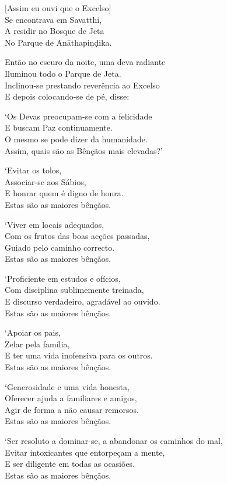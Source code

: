 [Assim eu ouvi que o Excelso]\\
Se encontrava em Savatthi,\\
A residir no Bosque de Jeta\\
No Parque de Anāthapiṇḍika.

Então no escuro da noite, uma deva radiante\\
Iluminou todo o Parque de Jeta.\\
Inclinou-se prestando reverência ao Excelso\\
E depois colocando-se de pé, disse:

`Os Devas preocupam-se com a felicidade\\
E buscam Paz continuamente.\\
O mesmo se pode dizer da humanidade.\\
Assim, quais são as Bênçãos mais elevadas?'

`Evitar os tolos,\\
Associar-se aos Sábios,\\
E honrar quem é digno de honra.\\
Estas são as maiores bênçãos.

`Viver em locais adequados,\\
Com os frutos das boas acções passadas,\\
Guiado pelo caminho correcto.\\
Estas são as maiores bênçãos.

\clearpage

`Proficiente em estudos e ofícios,\\
Com disciplina sublimemente treinada,\\
E discurso verdadeiro, agradável ao ouvido.\\
Estas são as maiores bênçãos.

`Apoiar os pais,\\
Zelar pela família,\\
E ter uma vida inofensiva para os outros.\\
Estas são as maiores bênçãos.

`Generosidade e uma vida honesta,\\
Oferecer ajuda a familiares e amigos,\\
Agir de forma a não causar remorsos.\\
Estas são as maiores bênçãos.

`Ser resoluto a dominar-se, a abandonar os caminhos do mal,\\
Evitar intoxicantes que entorpeçam a mente,\\
E ser diligente em todas as ocasiões.\\
Estas são as maiores bênçãos.

